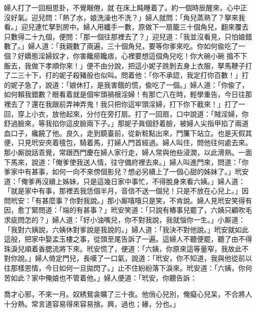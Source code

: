 婦人打了一回相思卦，不覺睏倦，就𢱉在床上盹睡着了。約一個時辰醒來，心中正沒好氣。{}迎兒問：「熱了水，娘洗澡也不洗？」婦人就問：「角兒蒸熟了？拏來我看。」迎兒連忙拏到房中。婦人用纖手一數，原做下一扇籠三十個角兒，翻來覆去只數得二十九個，便問：「那一個往那裡去了？」迎兒道：「我並沒看見，只怕娘錯數了。」婦人道：「我親數了兩遍，三十個角兒，要等你爹來吃。你如何偸吃了一個？好嬌態淫婦奴才，{}你害饞癆饞痞，心裡要想這個角兒吃！你大碗小碗𠳹搗不下飯去，我做下孝順你來！」便不由分說，把這小妮子跣剝去身上衣服，拏馬鞭子打了二三十下，打的妮子殺豬般也似叫。問着他：「你不承認，我定打你百數！」打的妮子急了，說道：「娘休打，是我害餓的慌，偸吃了一個。」婦人道：「你偸了，如何賴我錯數？眼看着就是個牢頭禍根淫婦！有那亡八在時，輕學重告，今日往那裡去了？還在我跟前弄神弄鬼！{}我只把你這牢頭淫婦，打下你下截來！」打了一回，穿上小衣，放他起來，分付在旁打扇。打了一回扇，口中說道：「賊淫婦，你舒過臉來，等我掐你這皮臉兩下子。」那妮子眞個舒着臉，被婦人尖指甲掐了兩道血口子，{}纔饒了他。良久，走到鏡臺前，從新粧點出來，門簾下站立。也是天假其便，只見玳安夾着氊包，騎着馬，打婦人門首經過。婦人叫住，問他往何處去來。那小厮說話乖覺，常跟西門慶在婦人家行走，婦人常與他些浸潤，以此滑熟。一面下馬來，說道：「俺爹使我送人情，往守備府裡去來。」婦人叫進門來，問道：「你爹家中有甚事，如何一向不來傍個影兒？想必另續上了一個心甜的姊妹了。」玳安道：「俺爹再沒續上姊妹，只是這幾日家中事忙，不得脫身來看六姨。」婦人道：「就是家中有事，那裡丟我恁個半月，音信不送一個兒！只是不放在心兒上。」因問玳安：「有甚麼事？你對我說。」那小厮嘻嘻只是笑，不肯說。{}婦人見玳安笑得有因，愈丁緊問道：「端的有甚事？」玳安笑道：「只說有樁事兒罷了，六姨只顧吹毛求疵問怎的？」婦人道：「好小油嘴兒，你不對我說，我就惱你一生。」{}小厮道：「我對六姨說，六姨休對爹說是我說的。」婦人道：「我決不對他說。」玳安就如此這般，把家中娶孟玉樓之事，從頭至尾告訴了一遍。這婦人不聽便罷，聽了由不得珠淚兒順着香腮流將下來。玳安慌了，便道：「六姨，你原來這等量窄，我故此不對你說。」婦人倚定門兒，長嘆了一口氣，說道：「玳安，你不知道，我與他從前以往那樣恩情，今日如何一旦拋閃了。」止不住紛紛落下淚來。玳安道：「六姨，你何苦如此？家中俺娘也不管着他。」婦人便道：「玳安，你聽告訴：

\begin{myquote} 
喬才心邪，不來一月。奴綉鴛衾曠了三十夜。他俏心兒別，俺癡心兒呆，不合將人十分熱。常言道容易得來容易捨。興，過也；緣，分也。」
\end{myquote} 

